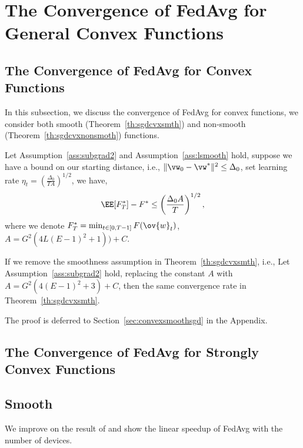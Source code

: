 \section{The Convergence of FedAvg for General Convex Functions}


\subsection{The Convergence of FedAvg for Convex Functions}
In this subsection, we discuss the convergence of FedAvg for convex functions,
we consider both smooth (Theorem~\ref{th:sgdcvxsmth}) and non-smooth (Theorem~\ref{th:sgdcvxnonsmoth})
functions. 

\begin{theorem}
Let Assumption~\ref{ass:subgrad2} and Assumption~\ref{ass:lsmooth} hold, suppose we have a bound 
on our starting distance, i.e., $\|\vw_{0} - \vw^*\|^2 \leq \Delta_0$, set learning rate $\eta_t =  \left(\frac{\Delta_0}{ T A}\right)^{1/2}$, we have,
$$\EE[ F_T^*] - F^*  \leq \left(\frac{ \Delta_0 A }{T}\right)^{1/2},$$
where we denote $F^*_T = \min_{t \in [0, T-1]} F(\ov{w}_t)$, $A = G^2( 4L(E-1)^2 + 1)) + C$.
\label{th:sgdcvxsmth}
\end{theorem}

\begin{theorem}
If we remove the smoothness assumption in Theorem~\ref{th:sgdcvxsmth}, i.e., 
	Let Assumption~\ref{ass:subgrad2} hold, replacing the constant $A$ with $A=G^2 \left(4(E-1)^2 + 3\right) + C$, then the same convergence rate in Theorem~\ref{th:sgdcvxsmth}.
	\label{th:sgdcvxnonsmoth}
\end{theorem}
The proof is deferred to Section~\ref{sec:convexsmoothsgd} in the Appendix. 

\subsection{The Convergence of FedAvg for Strongly Convex Functions}

\subsection{Smooth}
We improve on the result of \cite{li2019convergence} and show the linear speedup of FedAvg with the number of devices. 

